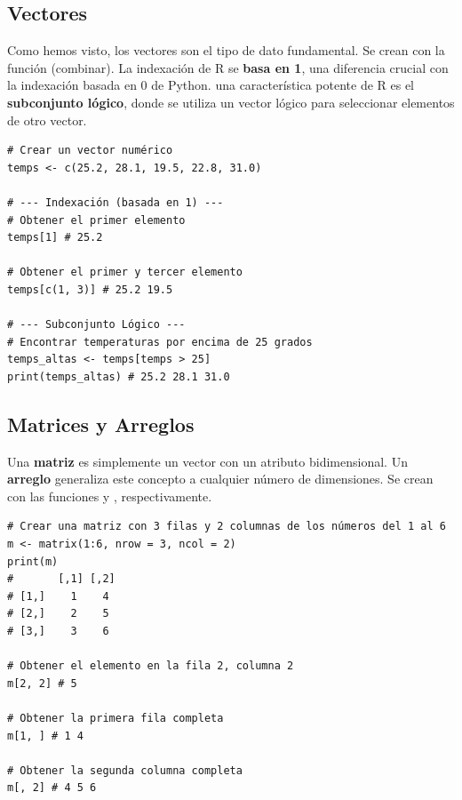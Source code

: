 \subsection*{Vectores}
Como hemos visto, los vectores son el tipo de dato fundamental. Se crean con la función  (combinar). La indexación de R se \textbf{basa en 1}, una diferencia crucial con la indexación basada en 0 de Python. una característica potente de R es el \textbf{subconjunto lógico}, donde se utiliza un vector lógico para seleccionar elementos de otro vector.

\begin{example}
\text{ }\begin{verbatim}
# Crear un vector numérico
temps <- c(25.2, 28.1, 19.5, 22.8, 31.0)

# --- Indexación (basada en 1) ---
# Obtener el primer elemento
temps[1] # 25.2

# Obtener el primer y tercer elemento
temps[c(1, 3)] # 25.2 19.5

# --- Subconjunto Lógico ---
# Encontrar temperaturas por encima de 25 grados
temps_altas <- temps[temps > 25]
print(temps_altas) # 25.2 28.1 31.0
\end{verbatim}
\end{example}

\subsection*{Matrices y Arreglos}
Una \textbf{matriz} es simplemente un vector con un atributo  bidimensional. Un \textbf{arreglo} generaliza este concepto a cualquier número de dimensiones. Se crean con las funciones  y , respectivamente.

\begin{example}
\text{ }\begin{verbatim}
# Crear una matriz con 3 filas y 2 columnas de los números del 1 al 6
m <- matrix(1:6, nrow = 3, ncol = 2)
print(m)
#       [,1] [,2]
# [1,]    1    4
# [2,]    2    5
# [3,]    3    6

# Obtener el elemento en la fila 2, columna 2
m[2, 2] # 5

# Obtener la primera fila completa
m[1, ] # 1 4

# Obtener la segunda columna completa
m[, 2] # 4 5 6
\end{verbatim}
\end{example}

